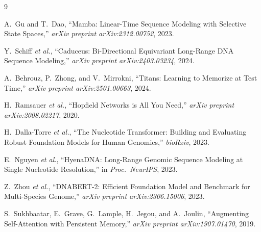 \documentclass[11pt,a4paper]{article}
\begin{document}
\begin{thebibliography}{9}

A.~Gu and T.~Dao, ``Mamba: Linear-Time Sequence Modeling with Selective State Spaces,'' \textit{arXiv preprint arXiv:2312.00752}, 2023.

Y.~Schiff \textit{et al.}, ``Caduceus: Bi-Directional Equivariant Long-Range DNA Sequence Modeling,'' \textit{arXiv preprint arXiv:2403.03234}, 2024.

A.~Behrouz, P.~Zhong, and V.~Mirrokni, ``Titans: Learning to Memorize at Test Time,'' \textit{arXiv preprint arXiv:2501.00663}, 2024.

H.~Ramsauer \textit{et al.}, ``Hopfield Networks is All You Need,'' \textit{arXiv preprint arXiv:2008.02217}, 2020.

H.~Dalla-Torre \textit{et al.}, ``The Nucleotide Transformer: Building and Evaluating Robust Foundation Models for Human Genomics,'' \textit{bioRxiv}, 2023.

E.~Nguyen \textit{et al.}, ``HyenaDNA: Long-Range Genomic Sequence Modeling at Single Nucleotide Resolution,'' in \textit{Proc.\ NeurIPS}, 2023.

Z.~Zhou \textit{et al.}, ``DNABERT-2: Efficient Foundation Model and Benchmark for Multi-Species Genome,'' \textit{arXiv preprint arXiv:2306.15006}, 2023.

S.~Sukhbaatar, E.~Grave, G.~Lample, H.~Jegou, and A.~Joulin, ``Augmenting Self-Attention with Persistent Memory,'' \textit{arXiv preprint arXiv:1907.01470}, 2019.

\end{thebibliography}
\end{document}
